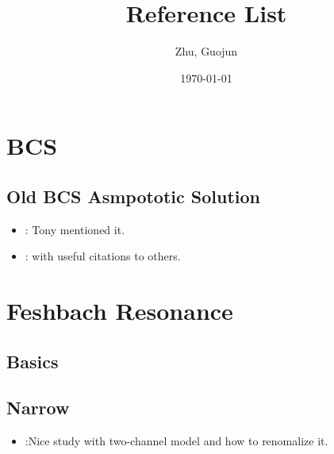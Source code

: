 \documentclass{article}
\title{Reference List}
\author{Zhu, Guojun}
\date{\today}
\begin{document}
\maketitle


\section{BCS}
\subsection{Old BCS Asmpototic Solution}
\begin{itemize}
  \item \cite{AndersonBCS}: Tony mentioned it.
	\item \cite{BcsExact}: with useful citations to others.         
 \end{itemize}

\section{Feshbach Resonance}
\subsection{Basics}
\subsection{Narrow}
\begin{itemize}
  \item \cite{JacksonNarrow}:Nice study with two-channel model and how to renomalize it. 
	
 \end{itemize}






\end{document}
